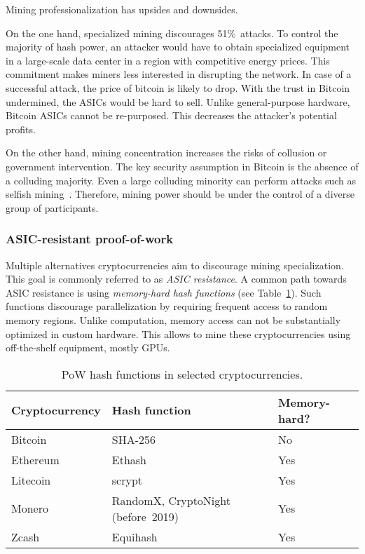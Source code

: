 Mining professionalization has upsides and downsides.

On the one hand, specialized mining discourages 51\%~attacks.
To control the majority of hash power, an attacker would have to obtain specialized equipment in a large-scale data center in a region with competitive energy prices.
This commitment makes miners less interested in disrupting the network.
In case of a successful attack, the price of bitcoin is likely to drop.
With the trust in Bitcoin undermined, the ASICs would be hard to sell.
Unlike general-purpose hardware, Bitcoin ASICs cannot be re-purposed.
This decreases the attacker's potential profits.

On the other hand, mining concentration increases the risks of collusion or government intervention.
The key security assumption in Bitcoin is the absence of a colluding majority.
Even a large colluding minority can perform attacks such as selfish mining~\cite{Eyal2018}.
Therefore, mining power should be under the control of a diverse group of participants.


\subsubsection*{ASIC-resistant proof-of-work}

Multiple alternatives cryptocurrencies aim to discourage mining specialization.
This goal is commonly referred to as \textit{ASIC resistance}.
A common path towards ASIC resistance is using \textit{memory-hard hash functions} (see Table~\ref{tab:pow-coins-hash-functions}).
Such functions discourage parallelization by requiring frequent access to random memory regions.
Unlike computation, memory access can not be substantially optimized in custom hardware.
This allows to mine these cryptocurrencies using off-the-shelf equipment, mostly GPUs.

\begin{table}[]
	\caption{PoW hash functions in selected cryptocurrencies.}
	\begin{tabular}{|l|l|l|}
		\hline
		\textbf{Cryptocurrency} & \textbf{Hash function} & \textbf{Memory-hard?} \\ \hline
		Bitcoin & SHA-256 & No \\ \hline
		Ethereum & Ethash & Yes \\ \hline
		Litecoin & scrypt & Yes \\ \hline
		Monero & RandomX, CryptoNight (before~2019) & Yes \\ \hline
		Zcash & Equihash & Yes \\ \hline
	\end{tabular}
	\label{tab:pow-coins-hash-functions}
\end{table}

